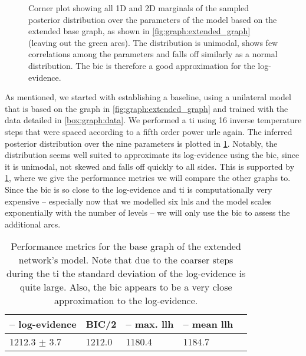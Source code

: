 \documentclass[\relativeRoot/main.tex]{subfiles}
\begin{document}
\begin{figure}
    \centering
    \def\svgwidth{1.04\textwidth}
    
    \caption[
        Corner plot displaying the posterior over parameters for the extended base graph
    ]{
        Corner plot showing all 1D and 2D marginals of the sampled posterior distribution over the parameters of the model based on the extended base graph, as shown in \cref{fig:graph:extended_graph} (leaving out the green arcs). The distribution is unimodal, shows few correlations among the parameters and falls off similarly as a normal distribution. The \gls{bic} is therefore a good approximation for the log-evidence.
    }
    \label{fig:graph:extended:base:corner}
\end{figure}

As mentioned, we started with establishing a baseline, using a unilateral model that is based on the graph in \cref{fig:graph:extended_graph} and trained with the data detailed in \cref{box:graph:data}. We performed a \gls{ti} using 16 inverse temperature steps that were spaced according to a fifth order power urle again. The inferred posterior distribution over the nine parameters is plotted in \cref{fig:graph:extended:base:corner}. Notably, the distribution seems well suited to approximate its log-evidence using the \gls{bic}, since it is unimodal, not skewed and falls off quickly to all sides. This is supported by \cref{table:graph:extended:base}, where we give the performance metrics we will compare the other graphs to. Since the \gls{bic} is so close to the log-evidence and \gls{ti} is computationally very expensive -- especially now that we modelled six \glspl{lnl} and the model scales exponentially with the number of levels -- we will only use the \gls{bic} to assess the additional arcs.

\begin{table}
    \centering
    \begin{tabular}{|l|l|l|l|l|}
        \hline
        \textbf{-- log-evidence} & \textbf{BIC/2} & \textbf{-- max. llh} & \textbf{-- mean llh} \\
        \hline
        1212.3 $\pm$ 3.7 & 1212.0 & 1180.4 & 1184.7 \\ 
        \hline
    \end{tabular}
    \caption[
        Performance of the extended base graph
    ]{
        Performance metrics for the base graph of the extended network's model. Note that due to the coarser steps during the \acrlong{ti} the standard deviation of the log-evidence is quite large. Also, the \gls{bic} appears to be a very close approximation to the log-evidence.
    }
    \label{table:graph:extended:base}
\end{table}
\end{document}
